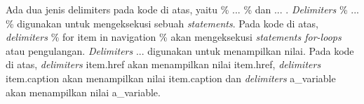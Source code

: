 Ada dua jenis delimiters pada kode di atas, yaitu {\% ... \%} dan {{ ... }}. \textit{Delimiters} {\% ... \%} digunakan untuk mengeksekusi sebuah \textit{statements}. Pada kode di atas, \textit{delimiters} {\% for item in navigation \%} akan mengeksekusi \textit{statements for-loops} atau pengulangan. \textit{Delimiters} {{ ... }} digunakan untuk menampilkan nilai. Pada kode di atas, \textit{delimiters} {{ item.href }} akan menampilkan nilai item.href, \textit{delimiters} {{ item.caption }} akan menampilkan nilai item.caption dan \textit{delimiters} {{ a\_variable }} akan menampilkan nilai a\_variable.




